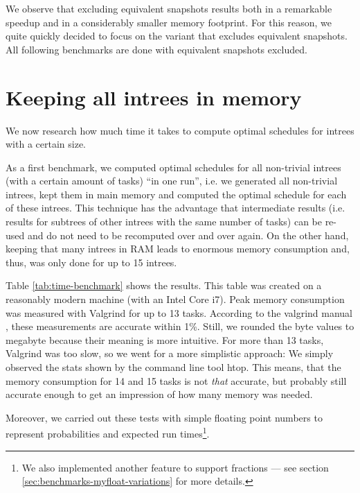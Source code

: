 We observe that excluding equivalent snapshots results both in a remarkable speedup and in a considerably smaller memory footprint. For this reason, we quite quickly decided to focus on the variant that excludes equivalent snapshots. All following benchmarks are done with equivalent snapshots excluded.

\section{Keeping all intrees in memory}
\label{sec:benchmarks-all-intrees-in-memory}

We now research how much time it takes to compute optimal schedules for intrees with a certain size.

As a first benchmark, we computed optimal schedules for all non-trivial intrees (with a certain amount of tasks) ``in one run'', i.e. we generated all non-trivial intrees, kept them in main memory and computed the optimal schedule for each of these intrees. This technique has the advantage that intermediate results (i.e. results for subtrees of other intrees with the same number of tasks) can be re-used and do not need to be recomputed over and over again. On the other hand, keeping that many intrees in RAM leads to enormous memory consumption and, thus, was only done for up to 15 intrees.

Table \ref{tab:time-benchmark} shows the results. This table was created on a reasonably modern machine (with an Intel Core i7). Peak memory consumption was measured with Valgrind for up to 13 tasks. According to the valgrind manual \cite{massifmanual}, these measurements are accurate within 1\%. Still, we rounded the byte values to megabyte because their meaning is more intuitive. For more than 13 tasks, Valgrind was too slow, so we went for a more simplistic approach: We simply observed the stats shown by the command line tool htop. This means, that the memory consumption for 14 and 15 tasks is not \emph{that} accurate, but probably still accurate enough to get an impression of how many memory was needed.

Moreover, we carried out these tests with simple floating point numbers to represent probabilities and expected run times\footnote{We also implemented another feature to support fractions --- see section \ref{sec:benchmarks-myfloat-variations} for more details.}.

